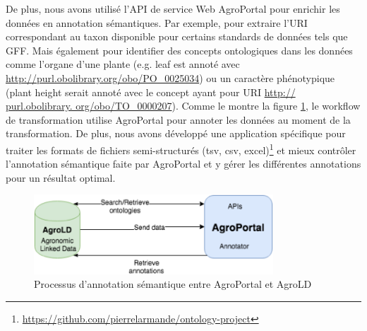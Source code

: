 De plus, nous avons utilisé l'API de service Web AgroPortal pour enrichir les données en annotation sémantiques. Par exemple, pour extraire l'URI correspondant au taxon disponible pour certains standards de données tels que GFF. Mais également pour identifier des concepts ontologiques dans les données comme l'organe d'une plante (e.g. leaf est annoté avec \url{http://purl.obolibrary.org/obo/PO\_0025034}) ou un caractère phénotypique (plant height serait annoté avec le concept ayant pour URI \url{http:// purl.obolibrary. org/obo/TO\_0000207}). Comme le montre la figure \ref{AgroPortal-AgroLD}, le workflow de transformation utilise AgroPortal pour annoter les données au moment de la transformation. De plus, nous avons développé une application spécifique pour traiter les formats de fichiers semi-structurés (tsv, csv, excel)\footnote{\url{https://github.com/pierrelarmande/ontology-project}} et mieux contrôler l'annotation sémantique faite par AgroPortal et y gérer les différentes annotations pour un résultat optimal. \\


\begin{figure}[!ht]
\begin{center}
	\includegraphics[width=0.80\textwidth]{Figures/AgroPortal-AgroLD.png}
\end{center}
\label{AgroPortal-AgroLD} 
\caption{Processus d'annotation sémantique entre AgroPortal et AgroLD}
\end{figure}

